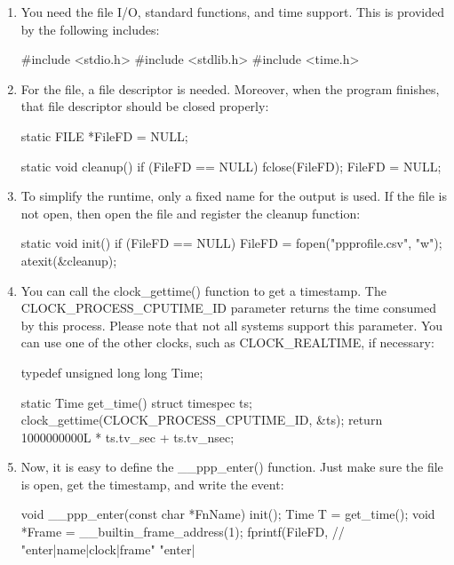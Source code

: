 \begin{enumerate}
\item
You need the file I/O, standard functions, and time support. This is provided by the following includes:

\begin{cpp}
#include <stdio.h>
#include <stdlib.h>
#include <time.h>
\end{cpp}

\item
For the file, a file descriptor is needed. Moreover, when the program finishes, that file descriptor should be closed properly:

\begin{cpp}
static FILE *FileFD = NULL;

static void cleanup() {
    if (FileFD == NULL) {
        fclose(FileFD);
        FileFD = NULL;
    }
}
\end{cpp}

\item
To simplify the runtime, only a fixed name for the output is used. If the file is not open, then open the file and register the cleanup function:

\begin{cpp}
static void init() {
    if (FileFD == NULL) {
        FileFD = fopen("ppprofile.csv", "w");
        atexit(&cleanup);
    }
}
\end{cpp}

\item
You can call the clock\_gettime() function to get a timestamp. The CLOCK\_PROCESS\_CPUTIME\_ID parameter returns the time consumed by this process. Please note that not all systems support this parameter. You can use one of the other clocks, such as CLOCK\_REALTIME, if necessary:

\begin{cpp}
typedef unsigned long long Time;

static Time get_time() {
    struct timespec ts;
    clock_gettime(CLOCK_PROCESS_CPUTIME_ID, &ts);
    return 1000000000L * ts.tv_sec + ts.tv_nsec;
}
\end{cpp}

\item
Now, it is easy to define the \_\_ppp\_enter() function. Just make sure the file is open, get the timestamp, and write the event:

\begin{cpp}
void __ppp_enter(const char *FnName) {
    init();
    Time T = get_time();
    void *Frame = __builtin_frame_address(1);
    fprintf(FileFD,
            // "enter|name|clock|frame"
            "enter|%
}
\end{cpp}


\end{enumerate}
